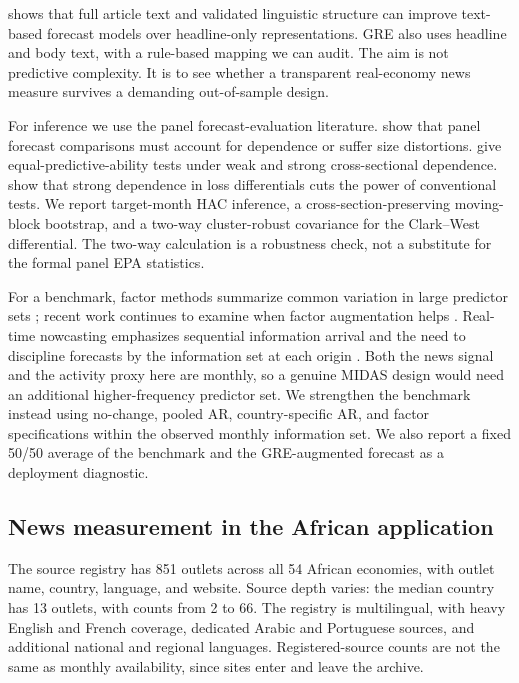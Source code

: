\documentclass[preprint,12pt,authoryear]{elsarticle}
\begin{document}
\citet{abeyie2026} shows that full article text and validated linguistic
structure can improve text-based forecast models over headline-only
representations. GRE also uses headline and body text, with a rule-based
mapping we can audit. The aim is not predictive complexity. It is to see
whether a transparent real-economy news measure survives a demanding
out-of-sample design.

For inference we use the panel forecast-evaluation literature.
\citet{qu2024} show that panel forecast comparisons must account for dependence
or suffer size distortions. \citet{akgun2024} give equal-predictive-ability
tests under weak and strong cross-sectional dependence. \citet{coroneo2025}
show that strong dependence in loss differentials cuts the power of
conventional tests. We report target-month HAC inference, a
cross-section-preserving moving-block bootstrap, and a two-way cluster-robust
covariance for the Clark--West differential. The two-way calculation is a
robustness check, not a substitute for the formal panel EPA statistics.

For a benchmark, factor methods summarize common variation in large predictor
sets \citep{stockwatson2002}; recent work continues to examine when factor
augmentation helps \citep{bae2024}. Real-time nowcasting emphasizes sequential
information arrival and the need to discipline forecasts by the information
set at each origin \citep{giannone2008,banbura2013,bok2018}. Both the news
signal and the activity proxy here are monthly, so a genuine MIDAS design
would need an additional higher-frequency predictor set. We strengthen the
benchmark instead using no-change, pooled AR, country-specific AR, and factor
specifications within the observed monthly information set. We also report a
fixed 50/50 average of the benchmark and the GRE-augmented forecast
\citep{timmermann2006,stockwatson2004} as a deployment diagnostic.

\subsection{News measurement in the African application}

The source registry has 851 outlets across all 54 African economies, with
outlet name, country, language, and website. Source depth varies: the median
country has 13 outlets, with counts from 2 to 66. The registry is multilingual,
with heavy English and French coverage, dedicated Arabic and Portuguese
sources, and additional national and regional languages. Registered-source
counts are not the same as monthly availability, since sites enter and leave
the archive.
\end{document}
